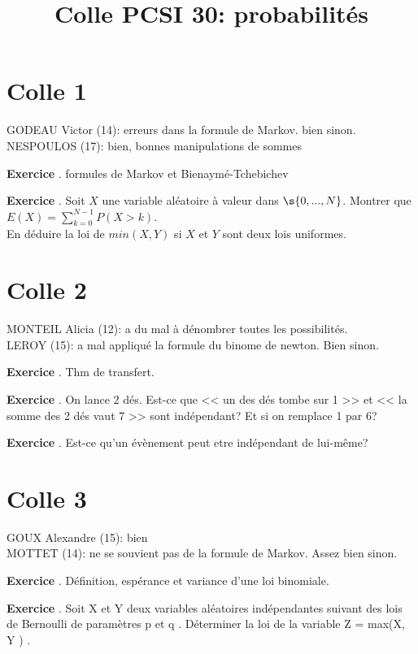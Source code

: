 \documentclass[10pt,a4paper]{article}
\title{Colle PCSI 30: probabilités}
\newcounter{question}
\newcounter{exo}
\newenvironment{exo}{\vspace{0.5cm}\setcounter{question}{0}\addtocounter{exo}{1} \noindent \textbf{Exercice \theexo}. \normalsize }{\par}
\begin{document}
	\maketitle
	
	\section*{Colle 1}
	GODEAU Victor (14): erreurs dans la formule de Markov. bien sinon.\\
	NESPOULOS (17): bien, bonnes manipulations de sommes\\
	
	\setcounter{exo}{0}
	
	\begin{exo}
		formules de Markov et Bienaymé-Tchebichev
	\end{exo}
	\begin{exo}
		Soit $X$ une variable aléatoire à valeur dans $\s{0, ..., N}$. Montrer que $E(X) = \sum_{k=0}^{N-1} P(X > k)$.\\
		En déduire la loi de  $min(X, Y)$ si $X$ et $Y$ sont deux lois uniformes.
	\end{exo}

	\section*{Colle 2}
	MONTEIL Alicia (12): a du mal à dénombrer toutes les possibilités.\\
	LEROY (15): a mal appliqué la formule du binome de newton. Bien sinon.\\
	
	\setcounter{exo}{0}

	\begin{exo}
		Thm de transfert.
	\end{exo}

	\begin{exo}
		On lance 2 dés. Est-ce que << un des dés tombe sur 1 >> et << la somme des 2 dés vaut 7 >> sont indépendant? Et si on remplace 1 par 6? 
	\end{exo}	
		
	\begin{exo}
		Est-ce qu'un évènement peut etre indépendant de lui-même?
	\end{exo}	
	
	\section*{Colle 3}
	\setcounter{exo}{0}
	GOUX Alexandre (15): bien\\
	MOTTET (14): ne se souvient pas de la formule de Markov. Assez bien sinon.\\
	
	\begin{exo}
		Définition, espérance et variance d'une loi binomiale.
	\end{exo}

	\begin{exo}
		Soit X et Y deux variables aléatoires indépendantes suivant des lois de
		Bernoulli de paramètres p et q . Déterminer la loi de la variable
		Z = max(X, Y ) .
	\end{exo}
	
\end{document}
